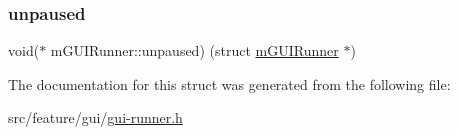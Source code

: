 \mbox{\label{structm_g_u_i_runner_a55bf92d832d54484a639ba183afb3131}} 
\subsubsection{\texorpdfstring{unpaused}{unpaused}}
{\footnotesize\ttfamily void($\ast$ m\+G\+U\+I\+Runner\+::unpaused) (struct \mbox{\hyperlink{structm_g_u_i_runner}{m\+G\+U\+I\+Runner}} $\ast$)}



The documentation for this struct was generated from the following file\+:\begin{DoxyCompactItemize}
\item 
src/feature/gui/\mbox{\hyperlink{gui-runner_8h}{gui-\/runner.\+h}}\end{DoxyCompactItemize}
